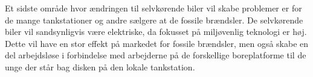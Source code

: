 Et sidste område hvor ændringen til selvkørende biler vil skabe problemer er for de mange tankstationer og andre sælgere at de fossile brændsler. De selvkørende biler vil sandsynligvis være elektriske, da fokusset på miljøvenlig teknologi er høj. Dette vil have en stor effekt på markedet for fossile brændsler, men også skabe en del arbejdsløse i forbindelse med arbejderne på de forskellige boreplatforme til de unge der står bag disken på den lokale tankstation\cite{GAS}.
